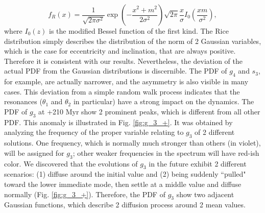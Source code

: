 \documentclass[12pt]{article}
\begin{document}
	\begin{equation} \label{eq:rice}
	f_R(x)  = \frac{1}{\sqrt{2 \pi \sigma^2}} \exp \left( - \frac{x^2 + m^2}{2 \sigma^2} \right) \sqrt{2\pi} \frac{x}{\sigma}  I_0 \left( \frac{xm}{\sigma^2} \right),
	\end{equation} 
	where $I_0(z)$ is the modified Bessel function of the first kind. The Rice distribution simply describes the distribution of the norm of 2 Gaussian variables, which is the case for eccentricity and inclination, that are always positive. Therefore it is consistent with our results.
	Nevertheless, the deviation of the actual PDF from the Gaussian distributions is discernible. The PDF of $g_4$ and $s_3$, for example, are actually narrower, and the asymmetry is also visible in many cases. This deviation from a simple random walk process indicates that the resonances ($\theta_1$ and $\theta_2$ in particular) have a strong impact on the dynamics.
	The PDF of $g_3$ at +210 Myr show 2 prominent peaks, which is different from all other PDF. This anomaly is illustrated in Fig. \ref{fig:g_3_+}. It was obtained by analyzing the frequency of the proper variable relating to $g_3$ of 2 different solutions. One frequency, which is normally much stronger than others (in violet), will be assigned for $g_3$; other weaker frequencies in the spectrum will have red-ish color. We discovered that the evolutions of $g_3$ in the future exhibit 2 different scenarios: (1) diffuse around the initial value and (2) being suddenly ``pulled"  toward the lower immediate mode, then settle at a middle value and diffuse normally (Fig. \ref{fig:g_3_+}). Therefore, the PDF of $g_3$ show two adjacent Gaussian functions, which describe 2 diffusion process around 2 mean values.
	
\end{document}
